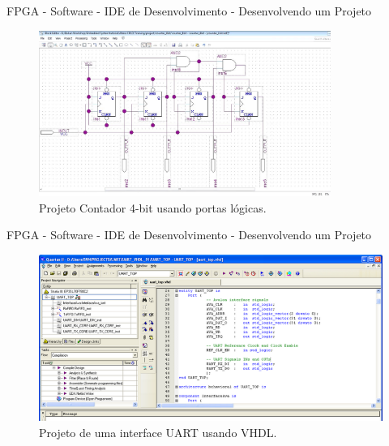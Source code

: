\documentclass[aspectratio=169]{beamer}
\begin{document}
	\begin{frame}{FPGA - Software - IDE de Desenvolvimento - Desenvolvendo um Projeto }
		\begin{figure}[p]
			\centering
			\includegraphics[width=0.85\textwidth]{img/fpga/software_quartus_portas2.jpg}
			\caption{Projeto Contador 4-bit usando portas lógicas.}
			\label{fig:alteraquartus_portas2}
		\end{figure}
	\end{frame}
	
	\begin{frame}{FPGA - Software - IDE de Desenvolvimento - Desenvolvendo um Projeto }
		\begin{figure}[p]
			\centering
			\includegraphics[width=1\textwidth]{img/fpga/software_quartus_vhdl.png}
			\caption{Projeto de uma interface UART usando VHDL.}
			\label{fig:alteraquartus_portas}
		\end{figure}
	\end{frame}
	
\end{document}
